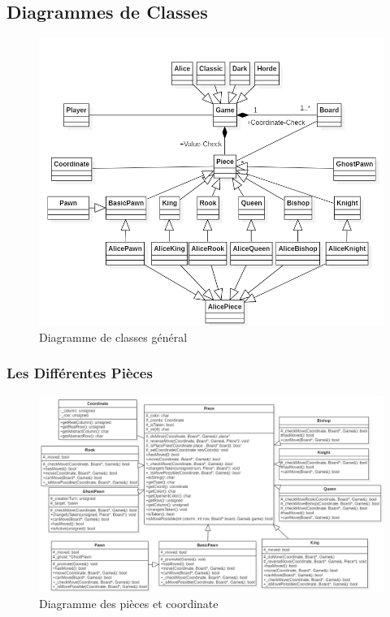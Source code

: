 \documentclass[10pt, a4paper]{article}
\begin{document}
\subsection{Diagrammes de Classes}
\begin{figure}[ht]
\centering
\includegraphics[scale=0.5]{ClassDiagram.png}
\caption{Diagramme de classes général}
\label{CD} %
\end{figure}

\subsubsection{Les Différentes Pièces}
\begin{figure}[ht]
\centering
\includegraphics[scale=0.5]{pieces_diagram.png}
\caption{Diagramme des pièces et coordinate}
\label{CD} %
\end{figure}
\end{document}

